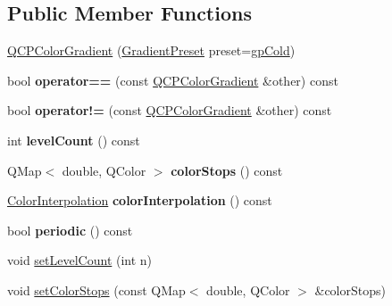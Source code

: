 \subsection*{Public Member Functions}
\begin{DoxyCompactItemize}
\item 
\hyperlink{class_q_c_p_color_gradient_a546e44df5fa1846400a582c041361c85}{Q\+C\+P\+Color\+Gradient} (\hyperlink{class_q_c_p_color_gradient_aed6569828fee337023670272910c9072}{Gradient\+Preset} preset=\hyperlink{class_q_c_p_color_gradient_aed6569828fee337023670272910c9072aec8c001f62c0d5cb853db5fd85309557}{gp\+Cold})
\item 
\hypertarget{class_q_c_p_color_gradient_a7f3478c33c59aa3c03b9ea1f809877fa}{}\label{class_q_c_p_color_gradient_a7f3478c33c59aa3c03b9ea1f809877fa} 
bool {\bfseries operator==} (const \hyperlink{class_q_c_p_color_gradient}{Q\+C\+P\+Color\+Gradient} \&other) const
\item 
\hypertarget{class_q_c_p_color_gradient_ad26a10e3beaef4fc6f2553d1a9756087}{}\label{class_q_c_p_color_gradient_ad26a10e3beaef4fc6f2553d1a9756087} 
bool {\bfseries operator!=} (const \hyperlink{class_q_c_p_color_gradient}{Q\+C\+P\+Color\+Gradient} \&other) const
\item 
\hypertarget{class_q_c_p_color_gradient_ac4b9d7034fc3b6c76318b05075367090}{}\label{class_q_c_p_color_gradient_ac4b9d7034fc3b6c76318b05075367090} 
int {\bfseries level\+Count} () const
\item 
\hypertarget{class_q_c_p_color_gradient_aaab19729e921682401044ac8e518ff02}{}\label{class_q_c_p_color_gradient_aaab19729e921682401044ac8e518ff02} 
Q\+Map$<$ double, Q\+Color $>$ {\bfseries color\+Stops} () const
\item 
\hypertarget{class_q_c_p_color_gradient_abad5002858db8cf75ecb045200881de6}{}\label{class_q_c_p_color_gradient_abad5002858db8cf75ecb045200881de6} 
\hyperlink{class_q_c_p_color_gradient_ac5dca17cc24336e6ca176610e7f77fc1}{Color\+Interpolation} {\bfseries color\+Interpolation} () const
\item 
\hypertarget{class_q_c_p_color_gradient_a22a1d2b17f203caf0dcec833507fb9e0}{}\label{class_q_c_p_color_gradient_a22a1d2b17f203caf0dcec833507fb9e0} 
bool {\bfseries periodic} () const
\item 
void \hyperlink{class_q_c_p_color_gradient_a18da587eb4f7fc788ea28ba15b6a12de}{set\+Level\+Count} (int n)
\item 
void \hyperlink{class_q_c_p_color_gradient_a724e828aa6f0ba5011a9392477c35d3a}{set\+Color\+Stops} (const Q\+Map$<$ double, Q\+Color $>$ \&color\+Stops)

\end{DoxyCompactItemize}
